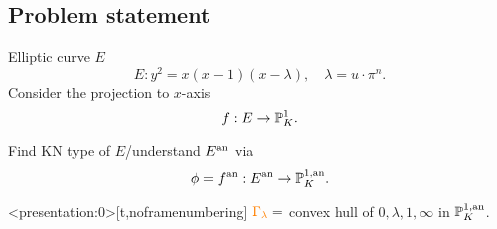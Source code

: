 \subsection{Problem statement} \label{sec:problem_statement}
\begin{frame}
	\begin{minipage}[t]{.7\textwidth}
	Elliptic curve $E$	
	\[
		E: y^2 = x(x-1)(x-\lambda), \quad \lambda = u\cdot \pi^{n}
	.\] 
	Consider the projection to $x$-axis 
	\[
	f: E \to \mathbb P^{1}_K
	.\] 
	\end{minipage}
	\begin{minipage}[t]{.29\textwidth}
	\end{minipage}

	\pause

	\begin{question}
	Find KN type of $E$/understand $E{}^{\text{an}}$ via \[
	\phi = f{}^{\text{an}} : E{}^{\text{an}} \to \mathbb P^{1, \text{an}}_K
	.\] 
	\end{question}

\end{frame}
\begin{frame}<presentation:0>[t,noframenumbering]
	${\color{orange} \Gamma_\lambda} = $ convex hull of $0, \lambda, 1, \infty$ in $\mathbb P^{1, \text{an}}_K$.
\begin{figure}[ht]
    \centering
\end{figure}
\end{frame}



